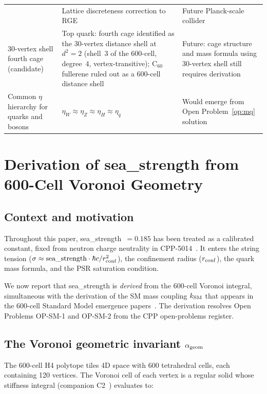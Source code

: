 \documentclass[11pt,letterpaper]{article}
\begin{document}
\begin{longtable}{@{}p{5.2cm}p{4cm}p{3.5cm}@{}}
  & Lattice discreteness correction to RGE
  & Future Planck-scale collider \\[4pt]
30-vertex shell fourth cage (candidate)
  & Top quark: fourth cage identified as the 30-vertex distance
    shell at $d^2=2$ (shell~3 of the 600-cell, degree~4, vertex-transitive);
    C$_{60}$ fullerene ruled out as a 600-cell distance shell
  & Future: cage structure and mass formula using 30-vertex
    shell still requires derivation \\[4pt]
Common $\eta$ hierarchy for quarks and bosons
  & $\eta_W \approx \eta_Z \approx \eta_H \approx \eta_q$
  & Would emerge from Open Problem~\ref{op:mq} solution \\
\end{longtable}

\section{Derivation of sea\_strength from 600-Cell Voronoi Geometry}
\label{sec:alpha_geom}

\subsection{Context and motivation}

Throughout this paper, sea\_strength~$= 0.185$ has been treated as
a calibrated constant, fixed from neutron charge neutrality in
CPP-5014~\citep{cpp5014}.  It enters the string tension
($\sigma \approx \text{sea\_strength} \cdot \hbar c / r_{\rm conf}^2$),
the confinement radius ($r_{\rm conf}$), the quark mass formula, and the
PSR saturation condition.

We now report that sea\_strength is \emph{derived} from the
600-cell Voronoi integral, simultaneous with the derivation of the
SM mass coupling $k_{\rm SM}$ that appears in the 600-cell Standard
Model emergence papers~\citep{cpp_sm_paper2}.  The derivation resolves
Open Problems OP-SM-1 and OP-SM-2 from the CPP open-problems
register.

\subsection{The Voronoi geometric invariant $\alpha_{\rm geom}$}

The 600-cell H4 polytope tiles 4D space with 600 tetrahedral cells,
each containing 120 vertices.  The Voronoi cell of each vertex is a
regular solid whose stiffness integral (companion C2~\citep{stiffness_c})
evaluates to:
\end{document}
